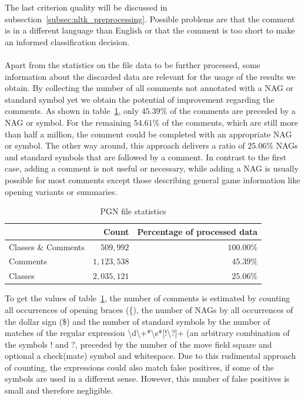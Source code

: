 \documentclass[article,type=msc,colorback,accentcolor=tud7b]{tudthesis}
\begin{document}
    The last criterion quality will be discussed in subsection~\ref{subsec:nltk_preprocessing}. Possible problems are that the comment is in a different language than English or that the comment is too short to make an informed classification decision. \\\\
    Apart from the statistics on the file data to be further processed, some information about the discarded data are relevant for the usage of the results we obtain. By collecting the number of all comments not annotated with a NAG or standard symbol yet we obtain the potential of improvement regarding the comments. As shown in table~\ref{tab:file_statistics}, only $45.39\%$ of the comments are preceded by a NAG or symbol. For the remaining $54.61\%$ of the comments, which are still more than half a million, the comment could be completed with an appropriate NAG or symbol. The other way around, this approach delivers a ratio of $25.06\%$ NAGs and standard symbols that are followed by a comment. In contrast to the first case, adding a comment is not useful or necessary, while adding a NAG is usually possible for most comments except those describing general game information like opening variants or summaries.
	
	\begin{table}[H]
      \begin{tabular}{| l | r | r |}
    	\hline
    	 & Count & Percentage of processed data \\ \hline
    	Classes \& Comments & $509,992$ & $100.00\%$ \\ \hline
    	Comments & $1,123,538$ & $45.39\%$ \\ \hline
    	Classes & $2,035,121$ & $25.06\%$ \\ \hline
      \end{tabular}
      \caption{PGN file statistics}
      \label{tab:file_statistics}
	\end{table}
	
    To get the values of table~\ref{tab:file_statistics}, the number of comments is estimated by counting all occurrences of opening braces (\{), the number of NAGs by all occurrences of the dollar sign (\$) and the number of standard symbols by the number of matches of the regular expression \textbackslash d\textbackslash+*\textbackslash s*[!\textbackslash?]+ (an arbitrary combination of the symbols $!$ and $?$, preceded by the number of the move field square and optional a check(mate) symbol and whitespace. Due to this rudimental approach of counting, the expressions could also match false positives, if some of the symbols are used in a different sense. However, this number of false positives is small and therefore negligible.	
\end{document}
